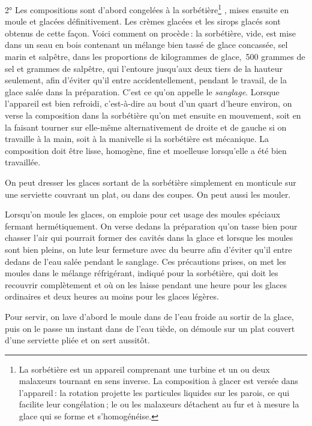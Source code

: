 2° Les compositions sont d'abord congelées à la sorbétière\footnote{La
sorbétière est un appareil comprenant une turbine et un ou deux malaxeurs
tournant en sens inverse. La composition à glacer est versée dans l'appareil :
la rotation projette les particules liquides sur les parois, ce qui facilite
leur congélation ; le ou les malaxeurs détachent au fur et à mesure la glace
qui se forme et s'homogénéise.} , mises ensuite en moule et glacées
définitivement. Les crèmes glacées et les sirops glacés sont obtenus de cette
façon. Voici comment on procède : la sorbétière, vide, est mise dans un seau en
bois contenant un mélange bien tassé de glace concassée, sel marin et salpêtre,
dans les proportions de {\mmm} kilogrammes de glace, { 500\mmm}
grammes de sel et {\mmm} grammes de salpêtre, qui l'entoure jusqu'aux
deux tiers de la hauteur seulement, afin d'éviter qu'il entre accidentellement,
pendant le travail, de la glace salée dans la préparation. C'est ce qu'on
appelle le  \textit{sanglage}. Lorsque
l'appareil est bien refroidi, c'est-à-dire au bout d'un quart d'heure environ,
on verse la composition dans la sorbétière qu'on met ensuite en mouvement, soit
en la faisant tourner sur elle-même alternativement de droite et de gauche si
on travaille à la main, soit à la manivelle si la sorbétière est mécanique. La
composition doit être lisse, homogène, fine et moelleuse lorsqu'elle a été bien
travaillée.

On peut dresser les glaces sortant de la sorbétière simplement en monticule sur
une serviette couvrant un plat, ou dans des coupes. On peut aussi les mouler.

Lorsqu'on moule les glaces, on emploie pour cet usage des moules spéciaux
fermant hermétiquement. On verse dedans la préparation qu'on tasse bien pour
chasser l'air qui pourrait former des cavités dans la glace et lorsque les
moules sont bien pleins, on lute leur fermeture avec du beurre afin d'éviter
qu'il entre dedans de l'eau salée pendant le sanglage. Ces précautions prises,
on met les moules dans le mélange réfrigérant, indiqué pour la sorbétière, qui
doit les recouvrir complètement et où on les laisse pendant une heure pour les
glaces ordinaires et deux heures au moins pour les glaces légères.

Pour servir, on lave d'abord le moule dans de l’eau froide au sortir de la glace,
puis on le passe un instant dans de l'eau tiède, on démoule sur un plat couvert
d'une serviette pliée et on sert aussitôt.

